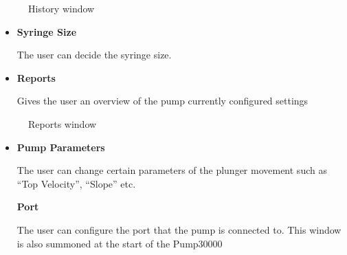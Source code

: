 \documentclass[letterpaper,10pt,english]{sphinxmanual}
\begin{document}
\begin{figure}[htbp]
\centering
\capstart

\caption{History window}\end{figure}
\begin{itemize}
\item {} 
\textbf{Syringe Size}

The user can decide the syringe size.

\item {} 
\textbf{Reports}

Gives the user an overview of the pump currently configured settings

\end{itemize}
\begin{figure}[htbp]
\centering
\capstart

\caption{Reports window}\end{figure}
\begin{itemize}
\item {} 
\textbf{Pump Parameters}

The user can change certain parameters of the plunger movement such as ``Top Velocity'', ``Slope'' etc.

\textbf{Port}

The user can configure the port that the pump is connected to. This window is
also summoned at the start of the Pump30000

\end{itemize}
\end{document}
